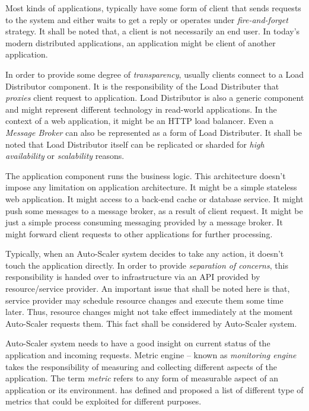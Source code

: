 \begin{description}[leftmargin=0pt]
    \item[Clients] Most kinds of applications, typically have some form of client that sends requests to the system and either waits to get a reply or operates under \emph{fire-and-forget} strategy. It shall be noted that, a client is not necessarily an end user. In today's modern distributed applications, an application might be client of another application.
    \item[Load Distributor] In order to provide some degree of \emph{transparency}, usually clients connect to a Load Distributor component. It is the responsibility of the Load Distributer that \emph{proxies} client request to application. Load Distributor is also a generic component and might represent different technology in read-world applications. In the context of a web application, it might be an HTTP load balancer. Even a \emph{Message Broker} can also be represented as a form of Load Distributer. It shall be noted that Load Distributor itself can be replicated or sharded for \emph{high availability} or \emph{scalability} reasons.
    \item[Application] The application component runs the business logic. This architecture doesn't impose any limitation on application architecture. It might be a simple stateless web application. It might access to a back-end cache or database service. It might push some messages to a message broker, as a result of client request. It might be just a simple process consuming messaging provided by a message broker. It might forward client requests to other applications for further processing.
    \item[Infrastructure API] Typically, when an Auto-Scaler system decides to take any action, it doesn't touch the application directly. In order to provide \emph{separation of concerns}, this responsibility is handed over to infrastructure via an API provided by resource/service provider. An important issue that shall be noted here is that, service provider may schedule resource changes and execute them some time later. Thus, resource changes might not take effect immediately at the moment Auto-Scaler requests them. This fact shall be considered by Auto-Scaler system.
    \item[Metric Engine] Auto-Scaler system needs to have a good insight on current status of the application and incoming requests. Metric engine -- known as \emph{monitoring engine} takes the responsibility of measuring and collecting different aspects of the application. The term \emph{metric} refers to any form of measurable aspect of an application or its environment. \textcite{Ghanbari:2011} has defined and proposed a list of different type of metrics that could be exploited for different purposes.

\end{description}
